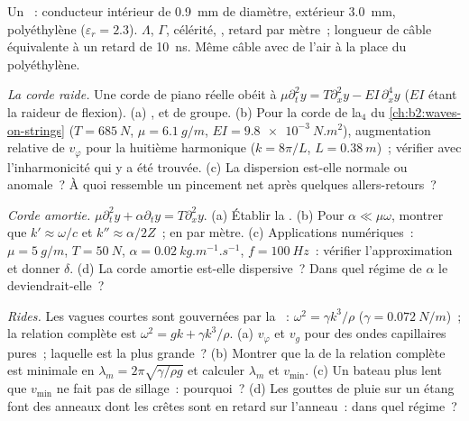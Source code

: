 \begin{exercise}[$\star$]\label{exo:b2:dispersion-wave-packets:4}
Un ~: conducteur intérieur de \qty{0.9}{mm} de diamètre, extérieur
\qty{3.0}{mm}, polyéthylène ($\varepsilon_r = 2.3$). $\Lambda$, $\Gamma$, célérité,
, retard par mètre~; longueur de câble équivalente
à un retard de \qty{10}{ns}. Même câble avec de l'air à la place du polyéthylène.
\end{exercise}

\begin{exercise}[$\star\star$]\label{exo:b2:dispersion-wave-packets:5}
\emph{La corde raide.} Une corde de piano réelle obéit à $\mu\partial_t^2y = T\partial_x^2y
- EI\,\partial_x^4y$ ($EI$ étant la raideur de flexion). (a) ,
 et de groupe. (b) Pour la corde de la$_4$ du
\cref{ch:b2:waves-on-strings} ($T = \qty{685}{N}$, $\mu = \qty{6.1}{g/m}$, $EI =
\qty{9.8e-3}{N.m^2}$), augmentation relative de $v_\varphi$ pour la huitième
harmonique ($k = 8\pi/L$, $L = \qty{0.38}{m}$)~; vérifier avec l'inharmonicité
qui y a été trouvée. (c) La dispersion est-elle normale ou anomale~? À quoi
ressemble un pincement net après quelques allers-retours~?
\end{exercise}

\begin{exercise}[$\star\star$]\label{exo:b2:dispersion-wave-packets:6}
\emph{Corde amortie.} $\mu\partial_t^2y + \alpha\partial_ty = T\partial_x^2y$. (a) Établir
la . (b) Pour $\alpha \ll \mu\omega$, montrer que $k' \approx \omega/c$ et
$k'' \approx \alpha/2Z$~;  en  par mètre. (c) Applications numériques~: $\mu =
\qty{5}{g/m}$, $T = \qty{50}{N}$, $\alpha = \qty{0.02}{kg.m^{-1}.s^{-1}}$, $f =
\qty{100}{Hz}$~: vérifier l'approximation et donner $\delta$. (d) La corde amortie
est-elle dispersive~? Dans quel régime de $\alpha$ le deviendrait-elle~?
\end{exercise}

\begin{exercise}[$\star\star$]\label{exo:b2:dispersion-wave-packets:7}
\emph{Rides.} Les vagues courtes sont gouvernées par la ~: $\omega^2 =
\gamma k^3/\rho$ ($\gamma = \qty{0.072}{N/m}$)~; la relation complète est $\omega^2 = gk +
\gamma k^3/\rho$. (a) $v_\varphi$ et $v_g$ pour des ondes capillaires pures~; laquelle est
la plus grande~? (b) Montrer que la  de la relation complète est
minimale en $\lambda_m = 2\pi\sqrt{\gamma/\rho g}$ et calculer $\lambda_m$ et $v_{\min}$.
(c) Un bateau plus lent que $v_{\min}$ ne fait pas de sillage~: pourquoi~? (d) Les gouttes de pluie sur un
étang font des anneaux dont les crêtes sont en retard sur l'anneau~: dans quel régime~?
\end{exercise}

